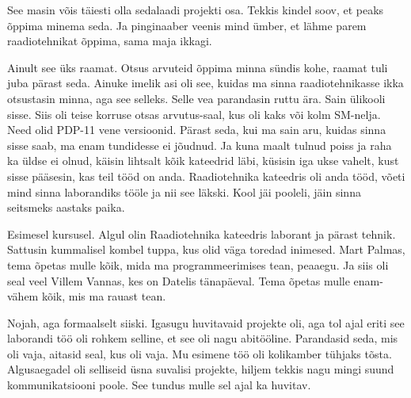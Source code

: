 
See masin võis täiesti olla sedalaadi projekti osa. Tekkis kindel soov, et 
peaks õppima minema seda. Ja pinginaaber veenis mind ümber, et lähme parem 
raadiotehnikat õppima, sama maja ikkagi.


Ainult see üks raamat. Otsus arvuteid õppima minna sündis kohe, raamat tuli 
juba pärast seda. Ainuke imelik asi oli see, kuidas ma sinna raadiotehnikasse 
ikka otsustasin minna, aga see selleks. Selle vea parandasin ruttu ära. Sain 
ülikooli sisse. Siis oli teise korruse otsas arvutus-saal, kus oli kaks või 
kolm SM-nelja. Need olid PDP-11 vene 
versioonid. Pärast seda, kui ma sain aru,  kuidas sinna sisse saab, ma enam 
tundidesse ei jõudnud. Ja kuna maalt tulnud poiss ja raha ka üldse ei olnud, 
käisin lihtsalt kõik kateedrid läbi, küsisin iga ukse vahelt, kust sisse 
pääsesin, kas teil tööd on anda. Raadiotehnika kateedris\label{sisu!mast_raadiotehnikas} oli anda tööd, 
võeti mind sinna laborandiks tööle ja nii see läkski. Kool jäi pooleli, jäin 
sinna seitsmeks aastaks paika.


Esimesel kursusel. Algul olin Raadiotehnika kateedris laborant  ja pärast 
tehnik. Sattusin kummalisel kombel tuppa, kus olid väga toredad inimesed. Mart 
Palmas, tema õpetas mulle kõik, mida ma 
programmeerimises tean, peaaegu. Ja siis oli seal veel Villem 
Vannas, kes on Datelis tänapäeval. Tema 
õpetas mulle enam-vähem kõik, mis ma rauast tean.


Nojah, aga formaalselt siiski.  Igasugu huvitavaid projekte oli, aga tol ajal 
eriti see laborandi töö oli rohkem selline, et see oli nagu abitööline. 
Parandasid seda, mis oli vaja, aitasid seal, kus oli vaja. Mu esimene töö oli 
kolikamber tühjaks tõsta.
Algusaegadel oli selliseid üsna suvalisi projekte, hiljem tekkis nagu mingi 
suund  kommunikatsiooni poole. See tundus mulle sel ajal ka huvitav. 


